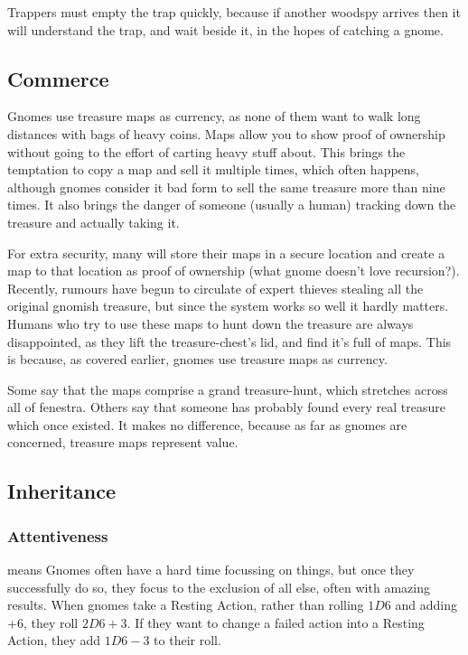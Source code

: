 Trappers must empty the trap quickly, because if another \gls{woodspy} arrives then it will understand the trap, and wait beside it, in the hopes of catching a gnome.

\subsection{Commerce}

Gnomes use treasure maps as currency, as none of them want to walk long distances with bags of heavy coins.
\ifodd\day%
  Maps allow you to show proof of ownership without going to the effort of carting heavy stuff about.
  This brings the temptation to copy a map and sell it multiple times, which often happens, although gnomes consider it bad form to sell the same treasure more than nine times.
  It also brings the danger of someone (usually a human) tracking down the treasure and actually taking it.

  For extra security, many will store their maps in a secure location and create a map to that location as proof of ownership (what gnome doesn't love recursion?).
  Recently, rumours have begun to circulate of expert thieves stealing all the original gnomish treasure, but since the system works so well it hardly matters.
\else%
  Humans who try to use these maps to hunt down the treasure are always disappointed, as they lift the treasure-chest's lid, and find it's full of maps.
  This is because, as covered earlier, gnomes use treasure maps as currency.

  Some say that the maps comprise a grand treasure-hunt, which stretches across all of \gls{fenestra}.
  Others say that someone has probably found every real treasure which once existed.
  It makes no difference, because as far as gnomes are concerned, treasure maps represent value.
\fi

\subsection{Inheritance}

\subsubsection[Attentiveness: roll 2D6+3 for resting actions]{Attentiveness}
\label{gnomishInheritance}
means Gnomes often have a hard time focussing on things, but once they successfully do so, they focus to the exclusion of all else, often with amazing results.
When gnomes take a Resting Action, rather than rolling $1D6$ and adding +6, they roll $2D6+3$.
If they want to change a failed action into a Resting Action, they add $1D6-3$ to their roll.

